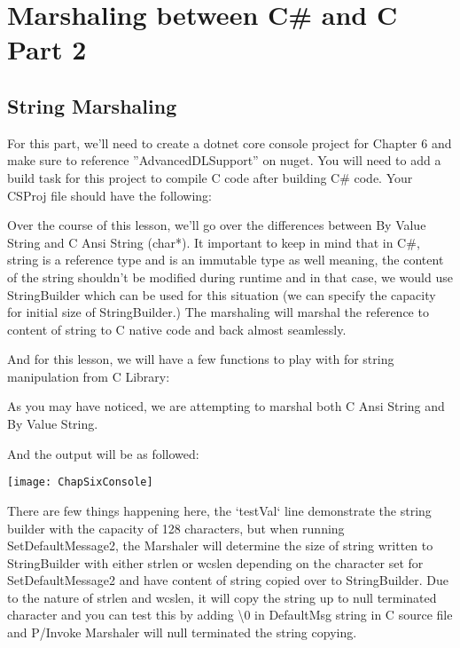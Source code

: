 \chapter{Marshaling between C\# and C Part 2}
\section{String Marshaling}
For this part, we'll need to create a dotnet core console project for Chapter 6 and make sure to reference ''AdvancedDLSupport'' on nuget. You will need to add a build task for this project to compile C code after building C\# code. Your CSProj file should have the following:


Over the course of this lesson, we'll go over the differences between By Value String and C Ansi String (char*). It important to keep in mind that in C\#, string is a reference type and is an immutable type as well meaning, the content of the string shouldn't be modified during runtime and in that case, we would use StringBuilder which can be used for this situation (we can specify the capacity for initial size of StringBuilder.) The marshaling will marshal the reference to content of string to C native code and back almost seamlessly.

\newpage
And for this lesson, we will have a few functions to play with for string manipulation from C Library:



As you may have noticed, we are attempting to marshal both C Ansi String and By Value String.
\newpage


And the output will be as followed:

\texttt{[image: ChapSixConsole]}
\newpage

There are few things happening here, the `testVal` line demonstrate the string builder with the capacity of 128 characters, but when running SetDefaultMessage2, the Marshaler will determine the size of string written to StringBuilder with either strlen or wcslen depending on the character set for SetDefaultMessage2 and have content of string copied over to StringBuilder. Due to the nature of strlen and wcslen, it will copy the string up to null terminated character and you can test this by adding \textbackslash 0 in DefaultMsg string in C source file and P/Invoke Marshaler will null terminated the string copying.

